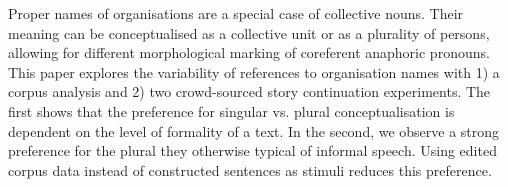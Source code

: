 Proper names of organisations are a special case of collective nouns. Their meaning can be conceptualised as a collective unit or as a plurality of persons, allowing for different morphological marking of coreferent anaphoric pronouns. This paper explores the variability of references to organisation names with 1) a corpus analysis and 2) two crowd-sourced story continuation experiments. The first shows that the preference for singular vs. plural conceptualisation is dependent on the level of formality of a text. In the second, we observe a strong preference for the plural they otherwise typical of informal speech. Using edited corpus data instead of constructed sentences as stimuli reduces this preference.

